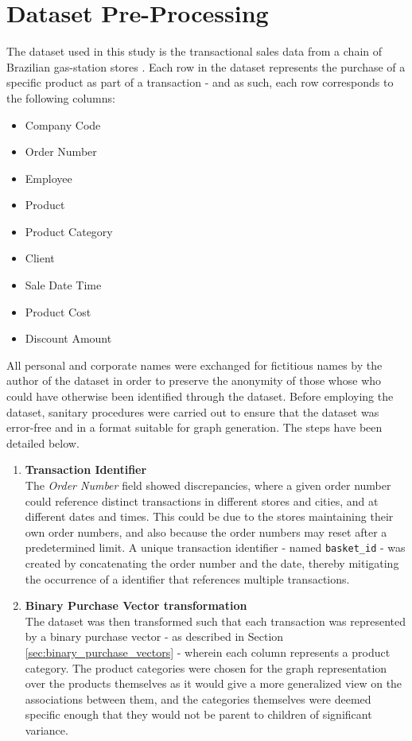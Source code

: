 \documentclass[paper=a4,fontsize=11pt]{report}	%
\begin{document}
\section{Dataset Pre-Processing}
The dataset used in this study is the transactional sales data from a chain of Brazilian gas-station stores \cite{data_source}.
Each row in the dataset represents the purchase of a specific product as part of a transaction - and as such, each row corresponds to the following columns:
\begin{itemize}
\item Company Code
\item Order Number
\item Employee
\item Product
\item Product Category
\item Client
\item Sale Date Time
\item Product Cost
\item Discount Amount
\end{itemize}
All personal and corporate names were exchanged for fictitious names by the author of the dataset in order to preserve the anonymity of those whose who could have otherwise been identified through the dataset. Before employing the dataset, sanitary procedures were carried out to ensure that the dataset was error-free and in a format suitable for graph generation. The steps have been detailed below.

\begin{enumerate}
\item \textbf{Transaction Identifier}\\
The \textit{Order Number} field showed discrepancies, where a given order number could reference distinct transactions in different stores and cities, and at different dates and times. 
This could be due to the stores maintaining their own order numbers, and also because the order numbers may reset after a predetermined limit.
A unique transaction identifier - named \texttt{basket\_id} - was created by concatenating the order number and the date, thereby mitigating the occurrence of a identifier that references multiple transactions.

\item \textbf{Binary Purchase Vector transformation}\\
The dataset was then transformed such that each transaction was represented by a binary purchase vector - as described in Section \ref{sec:binary_purchase_vectors} - wherein each column represents a product category. The product categories were chosen for the graph representation over the products themselves as it would give a more generalized view on the associations between them, and the categories themselves were deemed specific enough that they would not be parent to children of significant variance.

\end{enumerate} 
\end{document}
